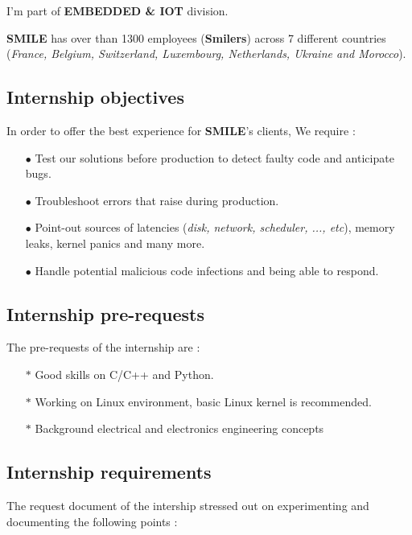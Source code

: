 \begin{center} \color{red}
I'm part of \textbf{EMBEDDED \& IOT} division.
\end{center}

\textbf{SMILE} has over than 1300 employees (\textbf{Smilers}) across 7 different countries (\textit{France, Belgium, Switzerland, Luxembourg, Netherlands, Ukraine and Morocco}).

\subsection{Internship objectives}
In order to offer the best experience for \textbf{SMILE}'s clients, We require :

\begin{itemize}
\item[$\bullet$] Test our solutions before production to detect faulty code and anticipate bugs.
\item[$\bullet$] Troubleshoot errors that raise during production. 
\item[$\bullet$] Point-out sources of latencies (\emph{disk, network, scheduler, ..., etc}), memory leaks, kernel panics and many more.
\item[$\bullet$] Handle potential malicious code infections and being able to respond.
\end{itemize}

  
\subsection{Internship pre-requests}

The pre-requests of the internship are : 
\begin{itemize}
	\item[$\ast$] {Good skills on C/C++ and Python.}
	\item[$\ast$] {Working on Linux environment, basic Linux kernel is recommended.}
	\item[$\ast$] {Background electrical and electronics engineering concepts}
\end{itemize}


\subsection{Internship requirements}
The request document of the intership stressed out on experimenting and documenting the following points :

